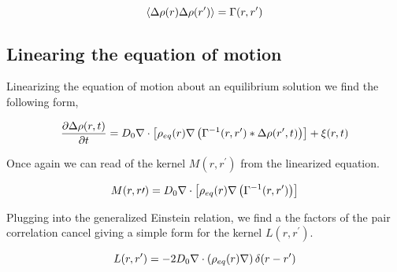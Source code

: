 \begin{equation}
	\left\langle \Delta\rho(r) \Delta\rho(r^\prime) \right\rangle = \Gamma(r, r^\prime)
\end{equation}

\subsection{Linearing the equation of motion}

Linearizing the equation of motion about an equilibrium solution we find the following form,

\begin{equation}
	\frac{\partial \Delta \rho (r, t)}{\partial t} = D_0\nabla \cdot \left[\rho_{eq}(r)\nabla \left(\Gamma^{-1}(r, r^\prime)\ast \Delta\rho(r^\prime, t)\right)\right] + \xi(r, t)
\end{equation}

Once again we can read of the kernel $M(r, r^\prime)$ from the linearized equation.

\begin{equation}
	M(r, r\prime) = D_0\nabla \cdot \left[\rho_{eq}(r)\nabla \left(\Gamma^{-1}(r, r^\prime)\right)\right]
\end{equation}

Plugging into the generalized Einstein relation, we find a the factors of the pair correlation cancel giving a simple form for the kernel $L(r, r^\prime)$.

\begin{equation}
	L(r, r^\prime) = -2D_0\nabla\cdot\left(\rho_{eq}(r)\nabla\right)\delta(r - r^\prime)
\end{equation}

\nocite{Ronis, Fox_and_Uhlenbeck, Lax}
